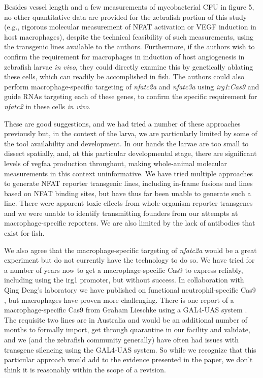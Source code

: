 \begin{description}[style=multiline, labelwidth=\widthof{Reviewer \#2:   }, font=\normalfont, leftmargin=\labelwidth, align=right]
\item[Reviewer \#2: ] \quad Besides vessel length and a few measurements of mycobacterial CFU in figure 5, no other quantitative data are provided for the zebrafish portion of this study (e.g., rigorous molecular measurement of NFAT activation or VEGF induction in host macrophages), despite the technical feasibility of such measurements, using the transgenic lines available to the authors. Furthermore, if the authors wish to confirm the requirement for macrophages in induction of host angiogenesis in zebrafish larvae \textit{in vivo}, they could directly examine this by genetically ablating these cells, which can readily be accomplished in fish. The authors could also perform macrophage\hyp{}specific targeting of \textit{nfatc2a} and \textit{nfatc3a} using \textit{irg1}:\textit{Cas9} and guide RNAs targeting each of these genes, to confirm the specific requirement for \textit{nfatc2} in these cells \textit{in vivo}.

\item[Response: ] \quad These are good suggestions, and we had tried a number of these approaches previously but, in the context of the larva, we are particularly limited by some of the tool availability and development. In our hands the larvae are too small to dissect spatially, and, at this particular developmental stage, there are significant levels of vegfaa production throughout, making whole\hyp{}animal molecular measurements in this context uninformative. We have tried multiple approaches to generate NFAT reporter transgenic lines, including in\hyp{}frame fusions and lines based on NFAT binding sites, but have thus far been unable to generate such a line. There were apparent toxic effects from whole\hyp{}organism reporter transgenes and we were unable to identify transmitting founders from our attempts at macrophage\hyp{}specific reporters. We are also limited by the lack of antibodies that exist for fish.

\item \quad We also agree that the macrophage\hyp{}specific targeting of \textit{nfatc2a} would be a great experiment but do not currently have the technology to do so. We have tried for a number of years now to get a macrophage\hyp{}specific Cas9 to express reliably, including using the irg1 promoter, but without success. In collaboration with Qing Deng’s laboratory we have published on functional neutrophil\hyp{}specific Cas9 \citep{Wang2021}, but macrophages have proven more challenging. There is one report of a macrophage\hyp{}specific Cas9 from Graham Lieschke using a GAL4\hyp{}UAS system \citep{Isiaku2021}. The requisite two lines are in Australia and would be an additional number of months to formally import, get through quarantine in our facility and validate, and we (and the zebrafish community generally) have often had issues with transgene silencing using the GAL4\hyp{}UAS system. So while we recognize that this particular approach would add to the evidence presented in the paper, we don’t think it is reasonably within the scope of a revision.


\end{description}
